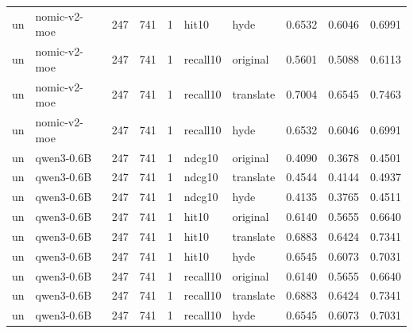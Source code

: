 \begin{tabular}{llrrrllrrr}
un & nomic-v2-moe & 247 & 741 & 1 & hit10 & hyde & 0.6532 & 0.6046 & 0.6991 \\
un & nomic-v2-moe & 247 & 741 & 1 & recall10 & original & 0.5601 & 0.5088 & 0.6113 \\
un & nomic-v2-moe & 247 & 741 & 1 & recall10 & translate & 0.7004 & 0.6545 & 0.7463 \\
un & nomic-v2-moe & 247 & 741 & 1 & recall10 & hyde & 0.6532 & 0.6046 & 0.6991 \\
un & qwen3-0.6B & 247 & 741 & 1 & ndcg10 & original & 0.4090 & 0.3678 & 0.4501 \\
un & qwen3-0.6B & 247 & 741 & 1 & ndcg10 & translate & 0.4544 & 0.4144 & 0.4937 \\
un & qwen3-0.6B & 247 & 741 & 1 & ndcg10 & hyde & 0.4135 & 0.3765 & 0.4511 \\
un & qwen3-0.6B & 247 & 741 & 1 & hit10 & original & 0.6140 & 0.5655 & 0.6640 \\
un & qwen3-0.6B & 247 & 741 & 1 & hit10 & translate & 0.6883 & 0.6424 & 0.7341 \\
un & qwen3-0.6B & 247 & 741 & 1 & hit10 & hyde & 0.6545 & 0.6073 & 0.7031 \\
un & qwen3-0.6B & 247 & 741 & 1 & recall10 & original & 0.6140 & 0.5655 & 0.6640 \\
un & qwen3-0.6B & 247 & 741 & 1 & recall10 & translate & 0.6883 & 0.6424 & 0.7341 \\
un & qwen3-0.6B & 247 & 741 & 1 & recall10 & hyde & 0.6545 & 0.6073 & 0.7031 \\
\bottomrule
\end{tabular}

